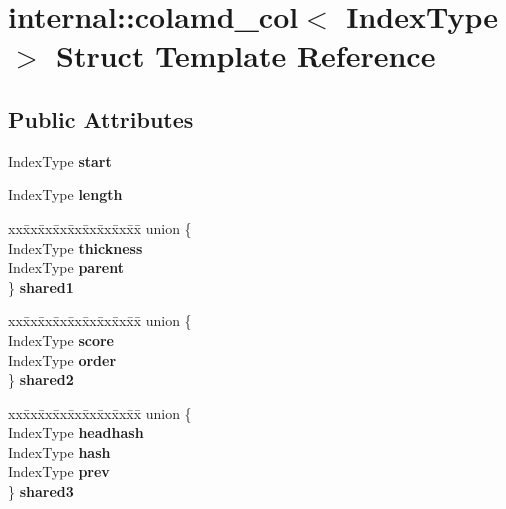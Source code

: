 \hypertarget{structinternal_1_1colamd__col}{}\section{internal\+:\+:colamd\+\_\+col$<$ Index\+Type $>$ Struct Template Reference}
\label{structinternal_1_1colamd__col}
\subsection*{Public Attributes}
\begin{DoxyCompactItemize}
\item 
\mbox{\label{structinternal_1_1colamd__col_a127a40c2b27808cd35f80a9d565d1634}} 
Index\+Type {\bfseries start}
\item 
\mbox{\label{structinternal_1_1colamd__col_ace6c1dba33e5567803b3ac65102d0505}} 
Index\+Type {\bfseries length}
\item 
\mbox{\label{structinternal_1_1colamd__col_acb7dc79223dd5073c1e6b158ba47973a}} 
\begin{tabbing}
xx\=xx\=xx\=xx\=xx\=xx\=xx\=xx\=xx\=\kill
union \{\\
\>IndexType {\bfseries thickness}\\
\>IndexType {\bfseries parent}\\
\} {\bfseries shared1}\\

\end{tabbing}\item 
\mbox{\label{structinternal_1_1colamd__col_a9944763ec996b604dc73fec60a6b0408}} 
\begin{tabbing}
xx\=xx\=xx\=xx\=xx\=xx\=xx\=xx\=xx\=\kill
union \{\\
\>IndexType {\bfseries score}\\
\>IndexType {\bfseries order}\\
\} {\bfseries shared2}\\

\end{tabbing}\item 
\mbox{\label{structinternal_1_1colamd__col_adba95a3cb287cc4c4e6355e5f7e74a49}} 
\begin{tabbing}
xx\=xx\=xx\=xx\=xx\=xx\=xx\=xx\=xx\=\kill
union \{\\
\>IndexType {\bfseries headhash}\\
\>IndexType {\bfseries hash}\\
\>IndexType {\bfseries prev}\\
\} {\bfseries shared3}\\


\end{tabbing}
\end{DoxyCompactItemize}
